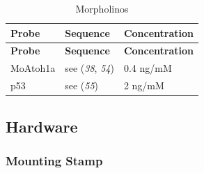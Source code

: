 \documentclass[11pt,singlespacinge,twoside]{reedthesis} %
\theoremstyle{definition}
\theoremstyle{definition}
\theoremstyle{definition}
\theoremstyle{remark}
\begin{document}
\begin{longtable}[]{@{}lll@{}}
\caption{\label{tab:mat-mos} Morpholinos}\tabularnewline
\toprule
\begin{minipage}[b]{0.11\columnwidth}\raggedright
\textbf{Probe}\strut
\end{minipage} & \begin{minipage}[b]{0.30\columnwidth}\raggedright
\textbf{Sequence}\strut
\end{minipage} & \begin{minipage}[b]{0.50\columnwidth}\raggedright
\textbf{Concentration}\strut
\end{minipage}\tabularnewline
\midrule
\endfirsthead
\toprule
\begin{minipage}[b]{0.11\columnwidth}\raggedright
\textbf{Probe}\strut
\end{minipage} & \begin{minipage}[b]{0.30\columnwidth}\raggedright
\textbf{Sequence}\strut
\end{minipage} & \begin{minipage}[b]{0.50\columnwidth}\raggedright
\textbf{Concentration}\strut
\end{minipage}\tabularnewline
\midrule
\endhead
\begin{minipage}[t]{0.11\columnwidth}\raggedright
MoAtoh1a\strut
\end{minipage} & \begin{minipage}[t]{0.30\columnwidth}\raggedright
see (\emph{38}, \emph{54})\strut
\end{minipage} & \begin{minipage}[t]{0.50\columnwidth}\raggedright
0.4 ng/mM\strut
\end{minipage}\tabularnewline
\begin{minipage}[t]{0.11\columnwidth}\raggedright
p53\strut
\end{minipage} & \begin{minipage}[t]{0.30\columnwidth}\raggedright
see (\emph{55})\strut
\end{minipage} & \begin{minipage}[t]{0.50\columnwidth}\raggedright
2 ng/mM\strut
\end{minipage}\tabularnewline
\bottomrule
\end{longtable}
\hypertarget{mat-hrdwr}{%
\subsection{Hardware}\label{mat-hrdwr}}

\hypertarget{mat-stamp}{%
\subsubsection{Mounting Stamp}\label{mat-stamp}}
\end{document}
